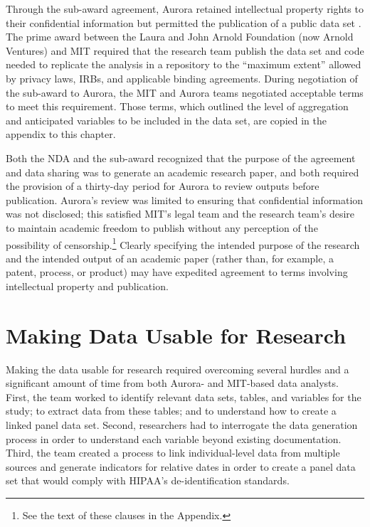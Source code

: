 Through the sub-award agreement, Aurora retained intellectual property rights to their confidential information but permitted the publication of a public data set \citep[see][]{doyle2018}. The prime award between the Laura and John Arnold Foundation (now Arnold Ventures) and MIT required that the research team publish the data set and code needed to replicate the analysis in a repository to the ``maximum extent'' allowed by privacy laws, IRBs, and applicable binding agreements. During negotiation of the sub-award to Aurora, the MIT and Aurora teams negotiated acceptable terms to meet this requirement. Those terms, which outlined the level of aggregation and anticipated variables to be included in the data set, are copied in the appendix to this chapter.

Both the NDA and the sub-award recognized that the purpose of the agreement and data sharing was to generate an academic research paper, and both required the provision of a thirty-day period for Aurora to review outputs before publication. Aurora's review was limited to ensuring that confidential information was not disclosed; this satisfied MIT's legal team and the research team's desire to maintain academic freedom to publish without any perception of the possibility of censorship.\footnote{See the text of these clauses in the Appendix.} Clearly specifying the intended purpose of the research and the intended output of an academic paper (rather than, for example, a patent, process, or product) may have expedited agreement to terms involving intellectual property and publication.

\hypertarget{making-data-usable-for-research-2}{%
\section{Making Data Usable for Research}\label{making-data-usable-for-research-2}}

Making the data usable for research required overcoming several hurdles and a significant amount of time from both Aurora- and MIT-based data analysts. First, the team worked to identify relevant data sets, tables, and variables for the study; to extract data from these tables; and to understand how to create a linked panel data set. Second, researchers had to interrogate the data generation process in order to understand each variable beyond existing documentation. Third, the team created a process to link individual-level data from multiple sources and generate indicators for relative dates in order to create a panel data set that would comply with HIPAA's de-identification standards.

